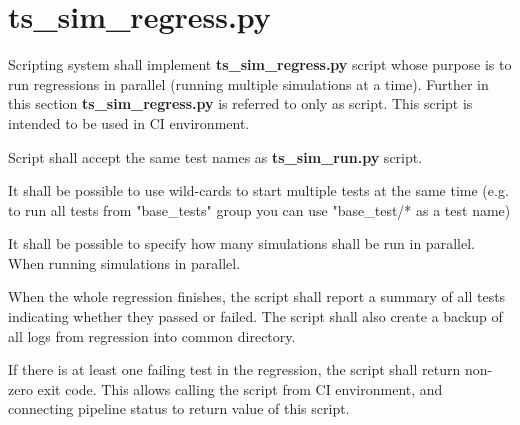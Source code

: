 \documentclass{tropic_design_spec}
\begin{document}
\section{ts_sim_regress.py}



    {Scripting system shall implement \textbf{ts_sim_regress.py} script whose purpose is
     to run regressions in parallel (running multiple simulations at a time). Further in
     this section \textbf{ts_sim_regress.py} is referred to only as script. This script
     is intended to be used in CI environment.}


    {Script shall accept the same test names as \textbf{ts_sim_run.py} script.}


    {It shall be possible to use wild-cards to start multiple tests at the same time
     (e.g. to run all tests from "base_tests" group you can use "base_test/* as a test
     name)}


    {It shall be possible to specify how many simulations shall be run in parallel. When
     running simulations in parallel.}


    {When the whole regression finishes, the script shall report a summary of all tests
     indicating whether they passed or failed. The script shall also create a backup of
     all logs from regression into common directory.}


    {If there is at least one failing test in the regression, the script shall return
     non-zero exit code. This allows calling the script from CI environment, and
     connecting pipeline status to return value of this script.}
			
\end{document}

